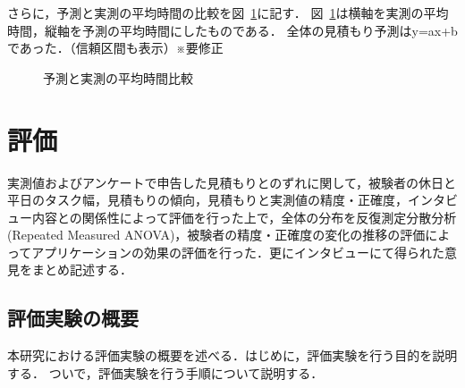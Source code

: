 さらに，予測と実測の平均時間の比較を図~\ref{fig:compare}に記す．
図~\ref{fig:compare}は横軸を実測の平均時間，縦軸を予測の平均時間にしたものである．
全体の見積もり予測はy=ax+bであった．（信頼区間も表示）※要修正

\begin{figure}[hb]
	\begin{center}
		\caption{予測と実測の平均時間比較}
		\label{fig:compare}
	\end{center}
\end{figure}


\chapter{評価}
実測値およびアンケートで申告した見積もりとのずれに関して，被験者の休日と平日のタスク幅，見積もりの傾向，見積もりと実測値の精度・正確度，インタビュー内容との関係性によって評価を行った上で，全体の分布を反復測定分散分析(Repeated Measured ANOVA)，被験者の精度・正確度の変化の推移の評価によってアプリケーションの効果の評価を行った．更にインタビューにて得られた意見をまとめ記述する．

\section{評価実験の概要}
本研究における評価実験の概要を述べる．はじめに，評価実験を行う目的を説明する．
ついで，評価実験を行う手順について説明する．

